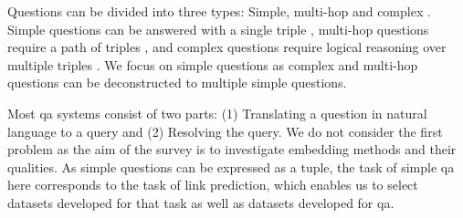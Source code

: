 Questions can be divided into three types: Simple, multi-hop and complex \cite{yani2021}.
Simple questions can be answered with a single triple \cite{bordes2015simple}, multi-hop questions require a path of triples \cite{zhang2017multihop}, and complex questions require logical reasoning over multiple triples \cite{talmorberant2018decomposition}.
We focus on simple questions as complex and multi-hop questions can be deconstructed to multiple simple questions.

Most \gls{qa} systems consist of two parts: (1) Translating a question in natural language to a query and (2) Resolving the query.
We do not consider the first problem as the aim of the survey is to investigate embedding methods and their qualities.
As simple questions can be expressed as a tuple, the task of simple \gls{qa} here corresponds to the task of link prediction, which enables us to select datasets developed for that task as well as datasets developed for \gls{qa}.